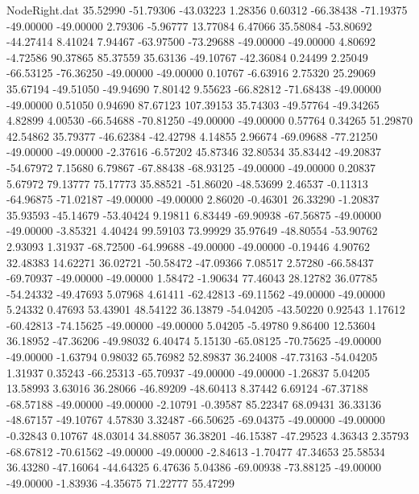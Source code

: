 \begin{filecontents}{NodeRight.dat}
  35.52990  -51.79306  -43.03223     1.28356    0.60312  -66.38438  -71.19375  -49.00000  -49.00000    2.79306   -5.96777   13.77084    6.47066
  35.58084  -53.80692  -44.27414     8.41024    7.94467  -63.97500  -73.29688  -49.00000  -49.00000    4.80692   -4.72586   90.37865   85.37559
  35.63136  -49.10767  -42.36084     0.24499    2.25049  -66.53125  -76.36250  -49.00000  -49.00000    0.10767   -6.63916    2.75320   25.29069
  35.67194  -49.51050  -49.94690     7.80142    9.55623  -66.82812  -71.68438  -49.00000  -49.00000    0.51050    0.94690   87.67123  107.39153
  35.74303  -49.57764  -49.34265     4.82899    4.00530  -66.54688  -70.81250  -49.00000  -49.00000    0.57764    0.34265   51.29870   42.54862
  35.79377  -46.62384  -42.42798     4.14855    2.96674  -69.09688  -77.21250  -49.00000  -49.00000   -2.37616   -6.57202   45.87346   32.80534
  35.83442  -49.20837  -54.67972     7.15680    6.79867  -67.88438  -68.93125  -49.00000  -49.00000    0.20837    5.67972   79.13777   75.17773
  35.88521  -51.86020  -48.53699     2.46537   -0.11313  -64.96875  -71.02187  -49.00000  -49.00000    2.86020   -0.46301   26.33290   -1.20837
  35.93593  -45.14679  -53.40424     9.19811    6.83449  -69.90938  -67.56875  -49.00000  -49.00000   -3.85321    4.40424   99.59103   73.99929
  35.97649  -48.80554  -53.90762     2.93093    1.31937  -68.72500  -64.99688  -49.00000  -49.00000   -0.19446    4.90762   32.48383   14.62271
  36.02721  -50.58472  -47.09366     7.08517    2.57280  -66.58437  -69.70937  -49.00000  -49.00000    1.58472   -1.90634   77.46043   28.12782
  36.07785  -54.24332  -49.47693     5.07968    4.61411  -62.42813  -69.11562  -49.00000  -49.00000    5.24332    0.47693   53.43901   48.54122
  36.13879  -54.04205  -43.50220     0.92543    1.17612  -60.42813  -74.15625  -49.00000  -49.00000    5.04205   -5.49780    9.86400   12.53604
  36.18952  -47.36206  -49.98032     6.40474    5.15130  -65.08125  -70.75625  -49.00000  -49.00000   -1.63794    0.98032   65.76982   52.89837
  36.24008  -47.73163  -54.04205     1.31937    0.35243  -66.25313  -65.70937  -49.00000  -49.00000   -1.26837    5.04205   13.58993    3.63016
  36.28066  -46.89209  -48.60413     8.37442    6.69124  -67.37188  -68.57188  -49.00000  -49.00000   -2.10791   -0.39587   85.22347   68.09431
  36.33136  -48.67157  -49.10767     4.57830    3.32487  -66.50625  -69.04375  -49.00000  -49.00000   -0.32843    0.10767   48.03014   34.88057
  36.38201  -46.15387  -47.29523     4.36343    2.35793  -68.67812  -70.61562  -49.00000  -49.00000   -2.84613   -1.70477   47.34653   25.58534
  36.43280  -47.16064  -44.64325     6.47636    5.04386  -69.00938  -73.88125  -49.00000  -49.00000   -1.83936   -4.35675   71.22777   55.47299

\end{filecontents}
